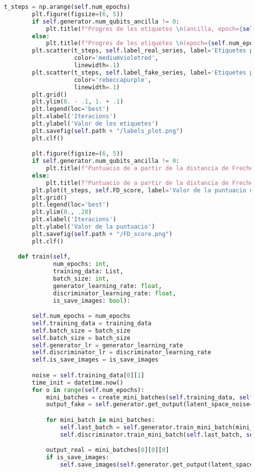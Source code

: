 \begin{lstlisting}[language=Python, caption=Codi per la definició del model]
		t_steps = np.arange(self.num_epochs)
		plt.figure(figsize=(6, 5))
		if self.generator.num_qubits_ancilla != 0:
			plt.title(f"Progres de les etiquetes \n(ancilla, epoch={self.num_epochs})")
		else:
			plt.title(f"Progres de les etiquetes \n(epoch={self.num_epochs})")
		plt.scatter(t_steps, self.label_real_series, label='Etiquetes per les imatges reals',
					color='mediumvioletred',
					linewidth=.1)
		plt.scatter(t_steps, self.label_fake_series, label='Etiquetes per les imatges generades',
					color='rebeccapurple',
					linewidth=.1)
		plt.grid()
		plt.ylim(0. - .1, 1. + .1)
		plt.legend(loc='best')
		plt.xlabel('Iteracions')
		plt.ylabel('Valor de les etiquetes')
		plt.savefig(self.path + "/labels_plot.png")
		plt.clf()

		plt.figure(figsize=(6, 5))
		if self.generator.num_qubits_ancilla != 0:
			plt.title(f"Puntuacio de a partir de la distancia de Frechet \n(ancilla, epoch={self.num_epochs})")
		else:
			plt.title(f"Puntuacio de a partir de la distancia de Frechet \n(epoch={self.num_epochs})")
		plt.plot(t_steps, self.FD_score, label='Valor de la puntuacio de Frechet', color='rebeccapurple', linewidth=2)
		plt.grid()
		plt.legend(loc='best')
		plt.ylim(0., .28)
		plt.xlabel('Iteracions')
		plt.ylabel('Valor de la puntuacio')
		plt.savefig(self.path + "/FD_score.png")
		plt.clf()

	def train(self,
			  num_epochs: int,
			  training_data: List,
		 	  batch_size: int,
			  generator_learning_rate: float,
			  discriminator_learning_rate: float,
			  is_save_images: bool):

		self.num_epochs = num_epochs
		self.training_data = training_data
		self.batch_size = batch_size
		self.batch_size = batch_size
		self.generator_lr = generator_learning_rate
		self.discriminator_lr = discriminator_learning_rate
		self.is_save_images = is_save_images

		noise = self.training_data[0][1]
		time_init = datetime.now()
		for o in range(self.num_epochs):
			mini_batches = create_mini_batches(self.training_data, self.batch_size)
			output_fake = self.generator.get_output(latent_space_noise=mini_batches[0][0][1], parameters=None)

			for mini_batch in mini_batches:
				self.last_batch = self.generator.train_mini_batch(mini_batch, self.generator_lr)
				self.discriminator.train_mini_batch(self.last_batch, self.discriminator_lr)

			output_real = mini_batches[0][0][0]
			if is_save_images:
				self.save_images(self.generator.get_output(latent_space_noise=noise, parameters=None), o)


\end{lstlisting}
